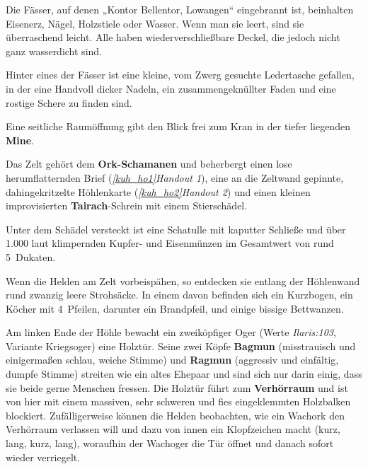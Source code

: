 Die Fässer, auf denen „Kontor Bellentor, Lowangen“ eingebrannt ist, beinhalten Eisenerz, Nägel, Holzstiele oder Wasser.
Wenn man sie leert, sind sie überraschend leicht.
Alle haben wiederverschließbare Deckel, die jedoch nicht ganz wasserdicht sind.

Hinter eines der Fässer ist eine kleine, vom Zwerg gesuchte Ledertasche gefallen, in der eine Handvoll dicker Nadeln, ein zusammengeknüllter Faden und eine rostige Schere zu finden sind.

Eine seitliche Raumöffnung gibt den Blick frei zum Kran in der tiefer liegenden \textbf{Mine}.


Das Zelt gehört dem \textbf{Ork-Schamanen} und beherbergt einen lose herumflatternden Brief (\emph{\ref{kuh_ho1}{Handout 1}}),
eine an die Zeltwand gepinnte, dahingekritzelte Höhlenkarte (\emph{\ref{kuh_ho2}{Handout 2}}) und einen kleinen improvisierten \textbf{Tairach}-Schrein mit einem Stierschädel.
		
Unter dem Schädel versteckt ist eine Schatulle mit kaputter Schließe und über 1.000 laut klimpernden Kupfer- und Eisenmünzen im Gesamtwert von rund 5~Dukaten.


Wenn die Helden am Zelt vorbeispähen, so entdecken sie entlang der Höhlenwand rund zwanzig leere Strohsäcke. In einem davon befinden sich ein Kurzbogen, ein Köcher mit 4~Pfeilen, darunter ein Brandpfeil, und einige bissige Bettwanzen.

Am linken Ende der Höhle bewacht ein zweiköpfiger Oger (Werte \emph{Ilaris:103}, Variante Kriegsoger) eine Holztür.
Seine zwei Köpfe \textbf{Bagmun} (misstrauisch und einigermaßen schlau, weiche Stimme) und \textbf{Ragmun} (aggressiv und einfältig, dumpfe Stimme) streiten wie ein altes Ehepaar und sind sich nur darin einig, dass sie beide gerne Menschen fressen.
Die Holztür führt zum \textbf{Verhörraum} und ist von hier mit einem massiven, sehr schweren und fies eingeklemmten Holzbalken blockiert.
Zufälligerweise können die Helden beobachten, wie ein Wachork den Verhörraum verlassen will und dazu von innen ein Klopfzeichen macht (kurz, lang, kurz, lang), woraufhin der Wachoger die Tür öffnet und danach sofort wieder verriegelt.

